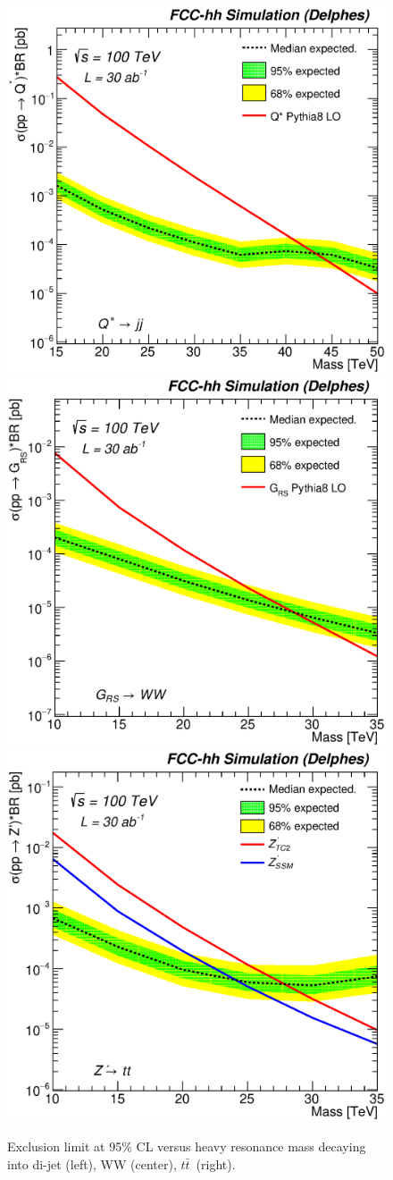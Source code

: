 \documentclass[a4paper,11pt]{article}
\newcommand*{\ttbar}{\ensuremath{t\bar{t}}}
\begin{document}
\begin{figure}[!htb]
  \centering
  \includegraphics[width=0.30\columnwidth]{Fig/lim_Qstar_jj_fcc_v02.eps}
  \includegraphics[width=0.30\columnwidth]{Fig/lim_RSGraviton_ww_fcc_v02.eps}
  \includegraphics[width=0.30\columnwidth]{Fig/lim_Zprime_tt_fcc_v02.eps}
  \caption{Exclusion limit at 95\% CL versus heavy resonance mass decaying into di-jet (left), WW (center), \ttbar\ (right).}
  \label{figure:hadronicresonances:limits}
\end{figure}
\end{document}

